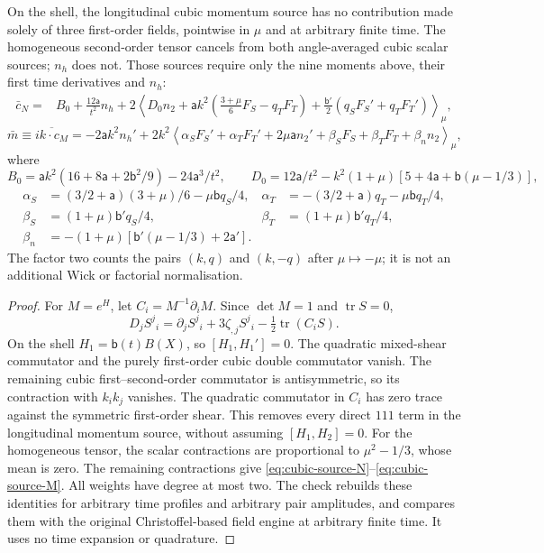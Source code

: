 \begin{proposition}\label{prop:cubic-moments}
On the shell, the longitudinal cubic momentum source has no contribution made solely of
three first-order fields, pointwise in $\mu$ and at arbitrary finite time. The homogeneous
second-order tensor cancels from both angle-averaged cubic scalar sources; $n_h$ does not.
Those sources require only the nine moments above, their first time derivatives and $n_h$:
\begin{align}
 \bar c_N={}&B_0+\frac{12\mathsf a}{t^2}n_h
 +2\left\langle D_0n_2+\mathsf a k^2\left(\frac{3+\mu}{6}F_S-q_TF_T\right)
 +\frac{\mathsf b'}2(q_SF_S'+q_TF_T')\right\rangle_\mu,\label{eq:cubic-source-N}\end{align}
\begin{equation}\label{eq:cubic-source-M}
 \bar m\equiv\overline{ik\cdot c_M}
 =-2\mathsf a k^2 n_h'
 +2k^2\left\langle\alpha_SF_S'+\alpha_TF_T'+2\mu\mathsf a n_2'
 +\beta_SF_S+\beta_TF_T+\beta_n n_2\right\rangle_\mu,
\end{equation}
where
\[
 B_0=\mathsf a k^2(16+8\mathsf a+2\mathsf b^2/9)-24\mathsf a^3/t^2,\qquad
 D_0=12\mathsf a/t^2-k^2(1+\mu)[5+4\mathsf a+\mathsf b(\mu-1/3)],
\]
\begin{align*}
 \alpha_S&=(3/2+\mathsf a)(3+\mu)/6-\mu\mathsf b q_S/4,&
 \alpha_T&=-(3/2+\mathsf a)q_T-\mu\mathsf b q_T/4,\\
 \beta_S&=(1+\mu)\mathsf b'q_S/4,&
 \beta_T&=(1+\mu)\mathsf b'q_T/4,\\
 \beta_n&=-(1+\mu)[\mathsf b'(\mu-1/3)+2\mathsf a'].
\end{align*}
The factor two counts the pairs $(k,q)$ and $(k,-q)$ after $\mu\mapsto-\mu$; it is not an
additional Wick or factorial normalisation.
\end{proposition}
\begin{proof}
For $M=e^H$, let $C_i=M^{-1}\partial_iM$. Since $\det M=1$ and $\operatorname{tr}S=0$,
\[
 D_jS^j{}_i=\partial_jS^j{}_i+3\zeta_{,j}S^j{}_i-\tfrac12\operatorname{tr}(C_iS).
\]
On the shell $H_1=\mathsf b(t)B(X)$, so $[H_1,H_1']=0$. The quadratic mixed-shear
commutator and the purely first-order cubic double commutator vanish. The remaining cubic
first--second-order commutator is antisymmetric, so its contraction with $k_ik_j$ vanishes.
The quadratic commutator in $C_i$ has zero trace against the symmetric first-order shear.
This removes every direct $111$ term in the longitudinal momentum source, without assuming
$[H_1,H_2]=0$. For the homogeneous tensor, the scalar contractions are proportional to
$\mu^2-1/3$, whose mean is zero. The remaining contractions give
\eqref{eq:cubic-source-N}--\eqref{eq:cubic-source-M}. All weights have degree at most two.
The check  rebuilds these identities
for arbitrary time profiles and arbitrary pair amplitudes, and compares them with the original
Christoffel-based field engine at arbitrary finite time. It uses no time expansion or quadrature.
\end{proof}

